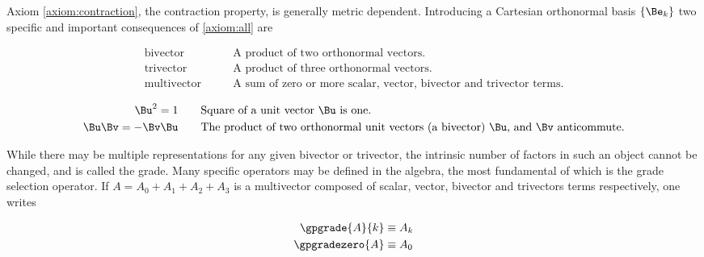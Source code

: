 Axiom \ref{axiom:contraction}, the contraction property, is generally metric dependent.  Introducing a Cartesian orthonormal basis $\{\Be_k\}$ two specific and important consequences of \ref{axiom:all} are

\begin{definition}
\begin{subequations}\label{def:basics}
\begin{align}
\text{bivector} & \qquad \mbox{A product of two orthonormal vectors.} \\
\text{trivector} & \qquad \mbox{A product of three orthonormal vectors.} \\
\text{multivector} & \qquad \mbox{A sum of zero or more scalar, vector, bivector and trivector terms.}
\end{align}
\end{subequations}
\end{definition}

\begin{theorem}
\begin{subequations}\label{thm:basics}
\begin{align}
{\Bu}^2 = 1 & \qquad \mbox{Square of a unit vector $\Bu$ is one.} \\
\Bu \Bv = -\Bv \Bu & \qquad \mbox{The product of two orthonormal unit vectors (a bivector) $\Bu$, and $\Bv$ anticommute.} 
\end{align}
\end{subequations}
\end{theorem}

While there may be multiple representations for any given bivector or trivector, the intrinsic number of factors in such an object cannot be changed, and is called the grade.  Many specific operators may be defined in the algebra, the most fundamental of which is the grade selection operator.  If $A = A_0 + A_1 + A_2 + A_3$ is a multivector composed of scalar, vector, bivector and trivectors terms respectively, one writes

\begin{definition}
\begin{subequations}\label{def:grade}
\begin{align}
\gpgrade{A}{k} &\equiv A_k \\
\gpgradezero{A} &\equiv A_0 \label{def:scalarSelection}
\end{align}
\end{subequations}
\end{definition}

